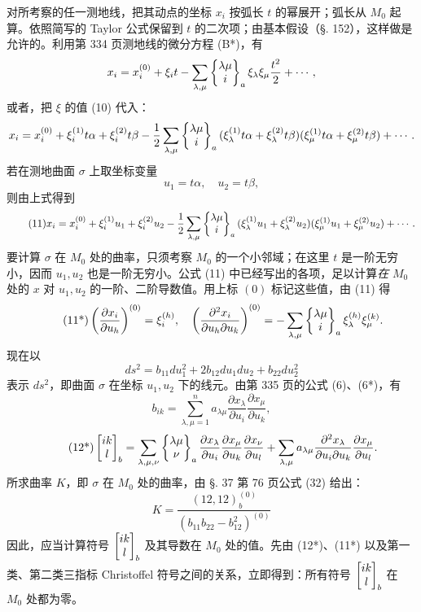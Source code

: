 对所考察的任一测地线，把其动点的坐标 \(x_i\) 按弧长 \(t\) 的幂展开；弧长从 \(M_0\) 起算。依照简写的 Taylor 公式保留到 \(t\) 的二次项；由基本假设（\S. 152），这样做是允许的。利用第 334 页测地线的微分方程 (B*)，有
\[
 x_i=x_i^{(0)}+\xi_i t-\sum_{\lambda,\mu}\left\{\begin{matrix}\lambda\mu\\i\end{matrix}\right\}_{a}\xi_\lambda\xi_\mu\frac{t^2}{2}+\cdots,
\]
或者，把 \(\xi\) 的值 (10) 代入：
\[
 x_i=x_i^{(0)}+\xi_i^{(1)}t\alpha+\xi_i^{(2)}t\beta-
 \frac12\sum_{\lambda,\mu}\left\{\begin{matrix}\lambda\mu\\i\end{matrix}\right\}_{a}
 (\xi_\lambda^{(1)}t\alpha+\xi_\lambda^{(2)}t\beta)
 (\xi_\mu^{(1)}t\alpha+\xi_\mu^{(2)}t\beta)+\cdots.
\]
若在测地曲面 \(\sigma\) 上取坐标变量
\[
 u_1=t\alpha,
\quad u_2=t\beta,
\]
则由上式得到
\begin{equation}\tag{11}
 x_i=x_i^{(0)}+\xi_i^{(1)}u_1+\xi_i^{(2)}u_2-
 \frac12\sum_{\lambda,\mu}\left\{\begin{matrix}\lambda\mu\\i\end{matrix}\right\}_{a}
 (\xi_\lambda^{(1)}u_1+\xi_\lambda^{(2)}u_2)
 (\xi_\mu^{(1)}u_1+\xi_\mu^{(2)}u_2)+\cdots.
\end{equation}
要计算 \(\sigma\) 在 \(M_0\) 处的曲率，只须考察 \(M_0\) 的一个小邻域；在这里 \(t\) 是一阶无穷小，因而 \(u_1,u_2\) 也是一阶无穷小。公式 (11) 中已经写出的各项，足以计算\emph{在} \(M_0\) 处的 \(x\) 对 \(u_1,u_2\) 的一阶、二阶导数值。用上标 \((0)\) 标记这些值，由 (11) 得
\begin{equation}\tag{11*}
 \left(\frac{\partial x_i}{\partial u_h}\right)^{(0)}=\xi_i^{(h)},
 \quad
 \left(\frac{\partial^2x_i}{\partial u_h\partial u_k}\right)^{(0)}
 =-\sum_{\lambda,\mu}\left\{\begin{matrix}\lambda\mu\\i\end{matrix}\right\}_{a}\xi_\lambda^{(h)}\xi_\mu^{(k)}.
\end{equation}
现在以
\[
 ds^2=b_{11}du_1^2+2b_{12}du_1du_2+b_{22}du_2^2
\]
表示 \(ds^2\)，即曲面 \(\sigma\) 在坐标 \(u_1,u_2\) 下的线元。由第 335 页的公式 (6)、(6*)，有
\begin{equation}\tag{12}
 b_{ik}=\sum_{\lambda,\mu=1}^{n}a_{\lambda\mu}
 \frac{\partial x_\lambda}{\partial u_i}\frac{\partial x_\mu}{\partial u_k},
\end{equation}
\begin{equation}\tag{12*}
 \left[\begin{matrix}ik\\l\end{matrix}\right]_{b}=\sum_{\lambda,\mu,\nu}\left\{\begin{matrix}\lambda\mu\\\nu\end{matrix}\right\}_{a}
 \frac{\partial x_\lambda}{\partial u_i}\frac{\partial x_\mu}{\partial u_k}\frac{\partial x_\nu}{\partial u_l}
 +\sum_{\lambda,\mu}a_{\lambda\mu}
 \frac{\partial^2x_\lambda}{\partial u_i\partial u_k}\frac{\partial x_\mu}{\partial u_l}.
\end{equation}
所求曲率 \(K\)，即 \(\sigma\) 在 \(M_0\) 处的曲率，由 \S. 37 第 76 页公式 (32) 给出：
\begin{equation}\tag{13}
 K=\frac{(12,12)^{(0)}_b}{(b_{11}b_{22}-b_{12}^{2})^{(0)}}
\end{equation}
因此，应当计算符号 \(\left[\begin{matrix}ik\\l\end{matrix}\right]_{b}\) 及其导数在 \(M_0\) 处的值。先由 (12*)、(11*) 以及第一类、第二类三指标 Christoffel 符号之间的关系，立即得到：所有符号 \(\left[\begin{matrix}ik\\l\end{matrix}\right]_{b}\) 在 \(M_0\) 处都为零。

